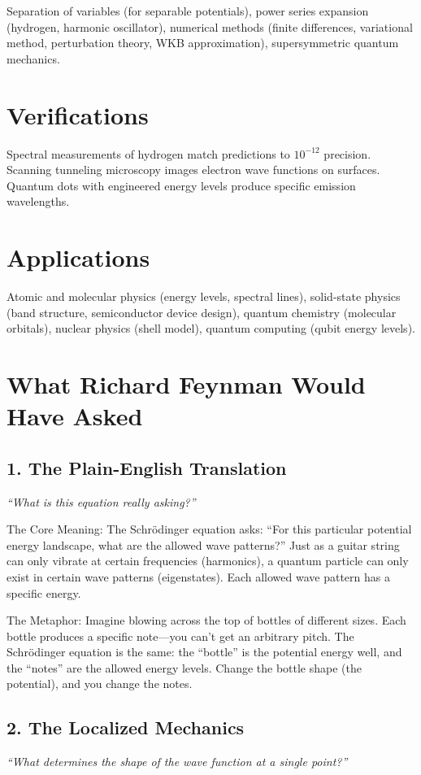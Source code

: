 Separation of variables (for separable potentials), power series expansion (hydrogen, harmonic oscillator), numerical methods (finite differences, variational method, perturbation theory, WKB approximation), supersymmetric quantum mechanics.
\section*{Verifications}

Spectral measurements of hydrogen match predictions to $10^{-12}$ precision. Scanning tunneling microscopy images electron wave functions on surfaces. Quantum dots with engineered energy levels produce specific emission wavelengths.
\section*{Applications}

Atomic and molecular physics (energy levels, spectral lines), solid-state physics (band structure, semiconductor device design), quantum chemistry (molecular orbitals), nuclear physics (shell model), quantum computing (qubit energy levels).
\section*{What Richard Feynman Would Have Asked}

\subsection*{1. The Plain-English Translation}
\textit{``What is this equation really asking?''}

The Core Meaning: The Schr\"odinger equation asks: ``For this particular potential energy landscape, what are the allowed wave patterns?'' Just as a guitar string can only vibrate at certain frequencies (harmonics), a quantum particle can only exist in certain wave patterns (eigenstates). Each allowed wave pattern has a specific energy.

The Metaphor: Imagine blowing across the top of bottles of different sizes. Each bottle produces a specific note---you can't get an arbitrary pitch. The Schr\"odinger equation is the same: the ``bottle'' is the potential energy well, and the ``notes'' are the allowed energy levels. Change the bottle shape (the potential), and you change the notes.

\subsection*{2. The Localized Mechanics}
\textit{``What determines the shape of the wave function at a single point?''}

